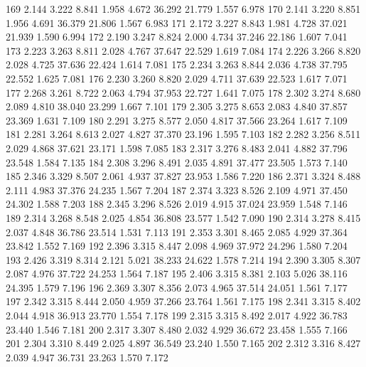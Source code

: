 \documentclass[a4paper,11pt]{scrartcl}
\begin{document}
\begin{Schunk}
\begin{Soutput}
169  2.144  3.222    8.841     1.958  4.672   36.292   21.779    1.557  6.978
170  2.141  3.220    8.851     1.956  4.691   36.379   21.806    1.567  6.983
171  2.172  3.227    8.843     1.981  4.728   37.021   21.939    1.590  6.994
172  2.190  3.247    8.824     2.000  4.734   37.246   22.186    1.607  7.041
173  2.223  3.263    8.811     2.028  4.767   37.647   22.529    1.619  7.084
174  2.226  3.266    8.820     2.028  4.725   37.636   22.424    1.614  7.081
175  2.234  3.263    8.844     2.036  4.738   37.795   22.552    1.625  7.081
176  2.230  3.260    8.820     2.029  4.711   37.639   22.523    1.617  7.071
177  2.268  3.261    8.722     2.063  4.794   37.953   22.727    1.641  7.075
178  2.302  3.274    8.680     2.089  4.810   38.040   23.299    1.667  7.101
179  2.305  3.275    8.653     2.083  4.840   37.857   23.369    1.631  7.109
180  2.291  3.275    8.577     2.050  4.817   37.566   23.264    1.617  7.109
181  2.281  3.264    8.613     2.027  4.827   37.370   23.196    1.595  7.103
182  2.282  3.256    8.511     2.029  4.868   37.621   23.171    1.598  7.085
183  2.317  3.276    8.483     2.041  4.882   37.796   23.548    1.584  7.135
184  2.308  3.296    8.491     2.035  4.891   37.477   23.505    1.573  7.140
185  2.346  3.329    8.507     2.061  4.937   37.827   23.953    1.586  7.220
186  2.371  3.324    8.488     2.111  4.983   37.376   24.235    1.567  7.204
187  2.374  3.323    8.526     2.109  4.971   37.450   24.302    1.588  7.203
188  2.345  3.296    8.526     2.019  4.915   37.024   23.959    1.548  7.146
189  2.314  3.268    8.548     2.025  4.854   36.808   23.577    1.542  7.090
190  2.314  3.278    8.415     2.037  4.848   36.786   23.514    1.531  7.113
191  2.353  3.301    8.465     2.085  4.929   37.364   23.842    1.552  7.169
192  2.396  3.315    8.447     2.098  4.969   37.972   24.296    1.580  7.204
193  2.426  3.319    8.314     2.121  5.021   38.233   24.622    1.578  7.214
194  2.390  3.305    8.307     2.087  4.976   37.722   24.253    1.564  7.187
195  2.406  3.315    8.381     2.103  5.026   38.116   24.395    1.579  7.196
196  2.369  3.307    8.356     2.073  4.965   37.514   24.051    1.561  7.177
197  2.342  3.315    8.444     2.050  4.959   37.266   23.764    1.561  7.175
198  2.341  3.315    8.402     2.044  4.918   36.913   23.770    1.554  7.178
199  2.315  3.315    8.492     2.017  4.922   36.783   23.440    1.546  7.181
200  2.317  3.307    8.480     2.032  4.929   36.672   23.458    1.555  7.166
201  2.304  3.310    8.449     2.025  4.897   36.549   23.240    1.550  7.165
202  2.312  3.316    8.427     2.039  4.947   36.731   23.263    1.570  7.172

\end{Soutput}
\end{Schunk}
\end{document}
